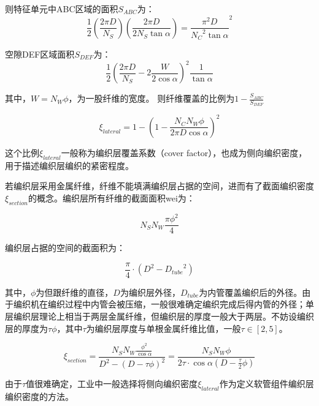则特征单元中ABC区域的面积$ S_{ABC} $为：
\begin{equation}
\frac{1}{2}\left( {\frac{{2\pi D}}{{{N_S}}}} \right)\left( {\frac{{2\pi D}}{{2{N_S}\tan \alpha }}} \right) = {\frac{{{\pi ^2}D}}{{{N_C}^2\tan \alpha }}^2}
\end{equation}


空隙DEF区域面积$ S_{DEF} $为：
\begin{equation}
\frac{1}{2}{\left( {\frac{{2\pi D}}{{{N_S}}} - 2\frac{W}{{2\cos \alpha }}} \right)^2}\frac{1}{{\tan \alpha }}
\end{equation}


其中，$ W = {N_W}\phi  $，为一股纤维的宽度。
则纤维覆盖的比例为$ 1 - \frac{{{S_{ABC}}}}{{{S_{DEF}}}} $


\begin{equation}
\xi_{lateral} = 1 - {\left( {1 - \frac{{{N_C}{N_W}\phi }}{{2\pi D\cos \alpha }}} \right)^2}
\end{equation}

这个比例$ \xi_{lateral}  $一般称为编织层覆盖系数（cover factor），也成为侧向编织密度，用于描述编织层编织的紧密程度。



若编织层采用金属纤维，纤维不能填满编织层占据的空间，进而有了截面编织密度$ \xi_{section} $的概念。编织层所有纤维的截面面积wei为：

\begin{equation}
{N_S}{N_W}\frac{{\pi {\phi ^2}}}{4}
\end{equation}

编织层占据的空间的截面积为：

\begin{equation}
\frac{\pi }{4}\cdot({D^2} - {D_{tube}}^2)
\end{equation}

其中，$ \phi $为但跟纤维的直径，$ D $为编织层外径，$ D_{tube} $为内管覆盖编织后的外径。由于编织机在编织过程中内管会被压缩，一般很难确定编织完成后得内管的外径；单层编织层理论上相当于两层金属纤维，但编织层的厚度一般大于两层。不妨设编织层的厚度为$ \tau\phi $，其中$ \tau $为编织层厚度与单根金属纤维比值，一般$ \tau  \in \left[ {2,5} \right]$。


\begin{equation}
\xi_{section}= \frac{{{N_S}{N_W}\frac{{{\phi ^2}}}{{\cos \alpha }}}}{{{D^2} - {{\left( {D - \tau \phi } \right)}^2}}} = \frac{{{N_S}{N_W}\phi }}{{2\tau  \cdot \cos \alpha (D - \frac{\tau }{2}\phi )}}
\end{equation}

由于$ \tau $值很难确定，工业中一般选择将侧向编织密度$ \xi_{lateral} $作为定义软管组件编织层编织密度的方法。


